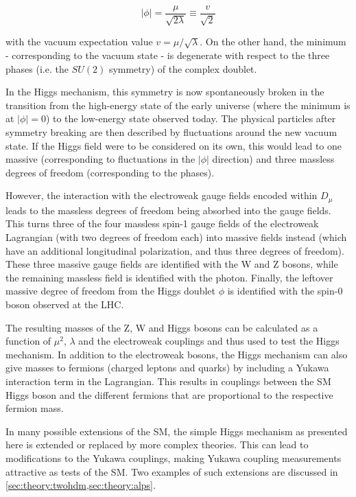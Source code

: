 \begin{equation}
    | \phi | = \frac{\mu}{\sqrt{2 \lambda}} \equiv \frac{v}{\sqrt{2}}
\end{equation}

\noindent with the vacuum expectation value $v = \mu / \sqrt{\lambda}$. On the other hand, the minimum - corresponding to the vacuum state - is degenerate with respect to the three phases (i.e. the $SU(2)$ symmetry) of the complex doublet.

In the Higgs mechanism, this symmetry is now spontaneously broken in the transition from the high-energy state of the early universe (where the minimum is at $|\phi| = 0$) to the low-energy state observed today. The physical particles after symmetry breaking are then described by fluctuations around the new vacuum state. If the Higgs field were to be considered on its own, this would lead to one massive (corresponding to fluctuations in the $|\phi|$ direction) and three massless degrees of freedom (corresponding to the phases).

However, the interaction with the electroweak gauge fields encoded within $D_\mu$ leads to the massless degrees of freedom being absorbed into the gauge fields. This turns three of the four massless spin-1 gauge fields of the electroweak Lagrangian (with two degrees of freedom each) into massive fields instead (which have an additional longitudinal polarization, and thus three degrees of freedom). These three massive gauge fields are identified with the W and Z bosons, while the remaining massless field is identified with the photon. Finally, the leftover massive degree of freedom from the Higgs doublet $\phi$ is identified with the spin-0 boson observed at the LHC.

The resulting masses of the Z, W and Higgs bosons can be calculated as a function of $\mu^2$, $\lambda$ and the electroweak couplings and thus used to test the Higgs mechanism. In addition to the electroweak bosons, the Higgs mechanism can also give masses to fermions (charged leptons and quarks) by including a Yukawa interaction term in the Lagrangian. This results in couplings between the SM Higgs boson and the different fermions that are proportional to the respective fermion mass. 

In many possible extensions of the SM, the simple Higgs mechanism as presented here is extended or replaced by more complex theories. This can lead to modifications to the Yukawa couplings, making Yukawa coupling measurements attractive as tests of the SM. Two examples of such extensions are discussed in \cref{sec:theory:twohdm,sec:theory:alps}.

